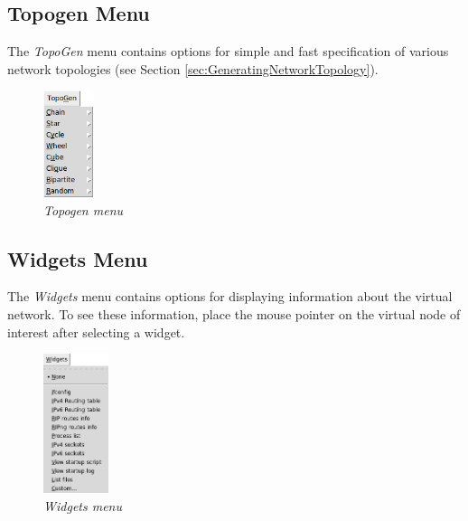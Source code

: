   \subsection{Topogen Menu}
  The \emph{TopoGen} menu contains options for simple and fast specification of
various network topologies (see Section \ref{sec:GeneratingNetworkTopology}).
  
  \begin{figure}[H]
  \centering
  \vspace{10pt}
  \includegraphics[width=0.13\textwidth]{./images/topogen_menu.png}
  \caption{\emph{Topogen menu}}
  \label{fig:topogen_menu}
  \end{figure}
  
 \subsection{Widgets Menu}
  The \emph{Widgets} menu contains options for displaying information about the
virtual network. To see these information, place the mouse pointer on the
virtual node of interest after selecting a widget.

 \begin{figure}[H]
  \centering
  \vspace{10pt}
  \includegraphics[width=0.17\textwidth]{./images/widgets_menu.png}
  \caption{\emph{Widgets menu}}
  \label{fig:widgets_menu}
  \end{figure}

